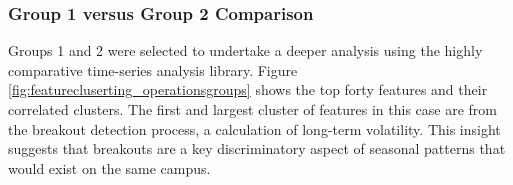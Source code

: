 \subsubsection{Group 1 versus Group 2 Comparison}
\label{sec:group1vsgroup2}

Groups 1 and 2 were selected to undertake a deeper analysis using the highly comparative time-series analysis library. Figure \ref{fig:featurecluserting_operationsgroups} shows the top forty features and their correlated clusters. The first and largest cluster of features in this case are from the breakout detection process, a calculation of long-term volatility. This insight suggests that breakouts are a key discriminatory aspect of seasonal patterns that would exist on the same campus.